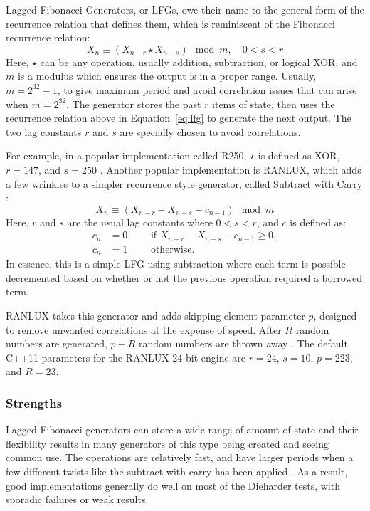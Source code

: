 Lagged Fibonacci Generators, or LFGs, owe their name to the general form of the recurrence relation that defines them, which is reminiscent of the Fibonacci recurrence relation:
\begin{equation} \label{eq:lfg}
    X_{n} \equiv \left(X_{n-r} \star X_{n-s}\right) \mod m,\quad 0 < s < r
\end{equation}
Here, $\star$ can be any operation, usually addition, subtraction, or logical XOR, and $m$ is a modulus which ensures the output is in a proper range. Usually, $m=2^{32} - 1$, to give maximum period and avoid correlation issues that can arise when $m=2^{32}$. The generator stores the past $r$ items of state, then uses the recurrence relation above in Equation~\ref{eq:lfg} to generate the next output. The two lag constants $r$ and $s$ are specially chosen to avoid correlations.

For example, in a popular implementation called R250, $\star$ is defined as XOR, $r=147$, and $s=250$ \cite{kirkpatrick1981very}. Another popular implementation is RANLUX, which adds a few wrinkles to a simpler recurrence style generator, called Subtract with Carry \cite{marsaglia1991new,marsaglia2003random}:
\begin{equation} \label{eqn:swc}
    X_{n} \equiv \left(X_{n-r} - X_{n-s} - c_{n-1}\right) \mod m
\end{equation}
Here, $r$ and $s$ are the usual lag constants where $0 < s < r$, and $c$ is defined as:
\begin{align*}
    c_n &= 0 \qquad \text{ if } X_{n-r} - X_{n-s} - c_{n-1} \geq 0, \\
    c_n &= 1 \qquad \text{ otherwise.}
\end{align*}
In essence, this is a simple LFG using subtraction where each term is possible decremented based on whether or not the previous operation required a borrowed term.

RANLUX takes this generator and adds skipping element parameter $p$, designed to remove unwanted correlations at the expense of speed. After $R$ random numbers are generated, $p-R$ random numbers are thrown away \cite{luscher1994portable,james1994ranlux}. The default C++11 parameters for the RANLUX 24 bit engine are $r=24$, $s=10$, $p=223$, and $R=23$.

\subsubsection{Strengths}
Lagged Fibonacci generators can store a wide range of amount of state and their flexibility results in many generators of this type being created and seeing common use. The operations are relatively fast, and have larger periods when a few different twists like the subtract with carry has been applied \cite{marsaglia2003random}. As a result, good implementations generally do well on most of the Dieharder tests, with sporadic failures or weak results.

